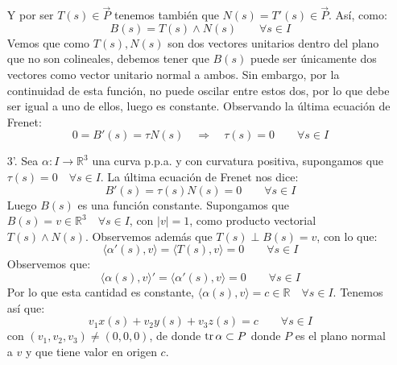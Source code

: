 \begin{ejemplo}
\begin{enumerate}
            Y por ser $T(s)\in \vec{P}$ tenemos también que $N(s) = T'(s) \in \vec{P}$. Así, como:
            \begin{equation*}
                B(s) = T(s)\land N(s) \qquad \forall s\in I
            \end{equation*}
            Vemos que como $T(s),N(s)$ son dos vectores unitarios dentro del plano que no son colineales, debemos tener que $B(s)$ puede ser únicamente dos vectores como vector unitario normal a ambos. Sin embargo, por la continuidad de esta función, no puede oscilar entre estos dos, por lo que debe ser igual a uno de ellos, luego es constante. Observando la última ecuación de Frenet:
            \begin{equation*}
                0 = B'(s) = \tau N(s) \quad\Longrightarrow\quad \tau(s) = 0 \qquad \forall s\in I
            \end{equation*}
        \item[3'.] Sea $\alpha:I\to \mathbb{R}^3$ una curva p.p.a. y con curvatura positiva, supongamos que $\tau(s) = 0 \quad \forall s\in I$. La última ecuación de Frenet nos dice:
            \begin{equation*}
                B'(s) = \tau(s)N(s) = 0 \qquad \forall s\in I
            \end{equation*}
            Luego $B(s)$ es una función constante. Supongamos que $B(s) = v\in \mathbb{R}^3 \quad \forall s\in I$, con $|v| = 1$, como producto vectorial $T(s)\land N(s)$. Observemos además que $T(s) \perp B(s) = v$, con lo que:
            \begin{equation*}
                \langle \alpha'(s),v \rangle = \langle T(s), v \rangle  = 0 \qquad \forall s\in I
            \end{equation*}
            Observemos que:
            \begin{equation*}
                \langle \alpha(s),v \rangle ' = \langle \alpha'(s),v \rangle  = 0 \qquad \forall s\in I
            \end{equation*}
            Por lo que esta cantidad es constante, $\langle \alpha(s),v \rangle = c\in \mathbb{R} \quad \forall s\in I$. Tenemos así que:
            \begin{equation*}
                v_1 x(s) + v_2 y(s) + v_3 z(s) = c \qquad \forall s\in I
            \end{equation*}
            con $(v_1,v_2,v_3) \neq (0, 0,0)$, de donde $\operatorname{tr} \alpha\subset P$ donde $P$ es el plano normal a $v$ y que tiene valor en origen $c$.
    \end{enumerate}
\end{ejemplo}

